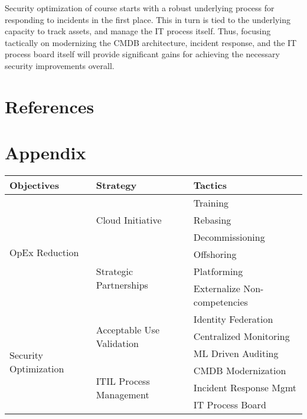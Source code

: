 \documentclass[stu]{apa7}
\begin{document}
Security optimization of course starts with a robust underlying process for responding to incidents in the first place. This in turn is tied to the underlying capacity to track assets, and manage the IT process itself. Thus, focusing tactically on modernizing the CMDB architecture, incident response, and the IT process board itself will provide significant gains for achieving the necessary security improvements overall.



\newpage
\section*{References}
\label{sec:orgf7337ea}
\printbibliography[heading=none]


\newpage
\section*{Appendix}
\label{sec:orgba31f39}
\noindent\begin{minipage}{\linewidth}
\centering

\centering
\begin{tabular}{l|l|l}
\textbf{Objectives}                    & \textbf{Strategy}                          & \textbf{Tactics}              \\
\hline\hline
\multirow{6}{*}{OpEx Reduction}        & \multirow{3}{*}{Cloud Initiative}          & Training                      \\
&                                            & Rebasing                      \\
&                                            & Decommissioning               \\
\cline{2-3}
& \multirow{3}{*}{Strategic Partnerships}    & Offshoring                    \\
&                                            & Platforming                   \\
&                                            & Externalize Non-competencies  \\
\hline
\multirow{6}{*}{Security Optimization} & \multirow{3}{*}{Acceptable Use Validation} & Identity Federation           \\
&                                            & Centralized Monitoring        \\
&                                            & ML Driven Auditing            \\
\cline{2-3}
& \multirow{3}{*}{ITIL Process Management}   & CMDB Modernization            \\
&                                            & Incident Response Mgmt        \\
&                                            & IT Process Board              \\
\hline\hline
\end{tabular}
\end{minipage}
\end{document}
